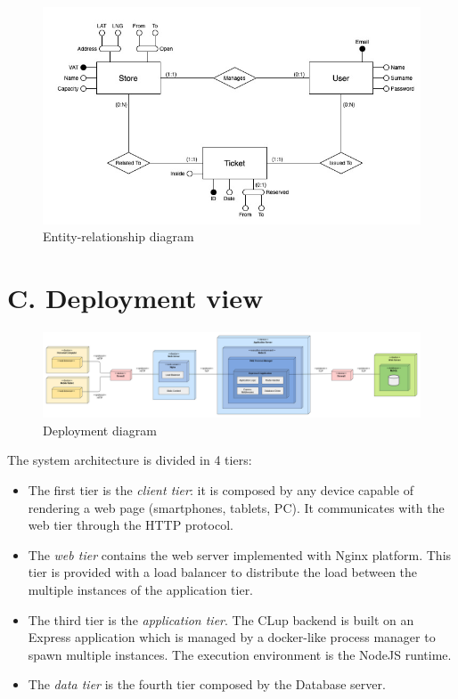 \begin{figure}[H]
\centering
\includegraphics{components_view/er_diagram}
\caption{Entity-relationship diagram}
\end{figure}

\section{C. Deployment view}

\begin{figure}[H]
\centering
\includegraphics{deployment_view/deployment_diagram}
\caption{Deployment diagram}
\end{figure}

The system architecture is divided in 4 tiers:
\begin{itemize}
\item
    The first tier is the \emph{client tier}: it is composed by any device capable of rendering a web page (smartphones, tablets, PC). It communicates with the web tier through the HTTP protocol.
\item
    The \emph{web tier} contains the web server implemented with Nginx platform. This tier is provided with a load balancer to distribute the load between the multiple instances of the application tier.
\item
    The third tier is the \emph{application tier}. The CLup backend is built on an Express application which is managed by a docker-like process manager to spawn multiple instances. The execution environment is the NodeJS runtime.
\item
    The \emph{data tier} is the fourth tier composed by the Database server.
\end{itemize}

